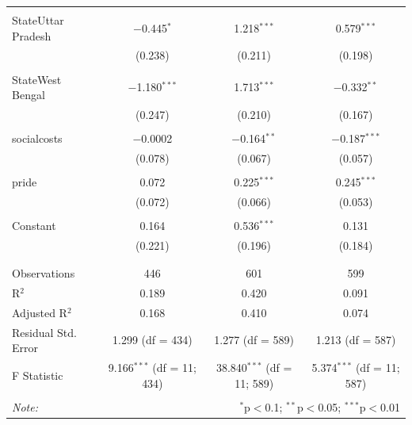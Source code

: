\documentclass[
]{article}
\begin{document}
\begin{table}[!htbp]
\begin{tabular}{@{\extracolsep{5pt}}lccc}
  & & & \\ 
 StateUttar Pradesh & $-$0.445$^{*}$ & 1.218$^{***}$ & 0.579$^{***}$ \\ 
  & (0.238) & (0.211) & (0.198) \\ 
  & & & \\ 
 StateWest Bengal & $-$1.180$^{***}$ & 1.713$^{***}$ & $-$0.332$^{**}$ \\ 
  & (0.247) & (0.210) & (0.167) \\ 
  & & & \\ 
 socialcosts & $-$0.0002 & $-$0.164$^{**}$ & $-$0.187$^{***}$ \\ 
  & (0.078) & (0.067) & (0.057) \\ 
  & & & \\ 
 pride & 0.072 & 0.225$^{***}$ & 0.245$^{***}$ \\ 
  & (0.072) & (0.066) & (0.053) \\ 
  & & & \\ 
 Constant & 0.164 & 0.536$^{***}$ & 0.131 \\ 
  & (0.221) & (0.196) & (0.184) \\ 
  & & & \\ 
\hline \\[-1.8ex] 
Observations & 446 & 601 & 599 \\ 
R$^{2}$ & 0.189 & 0.420 & 0.091 \\ 
Adjusted R$^{2}$ & 0.168 & 0.410 & 0.074 \\ 
Residual Std. Error & 1.299 (df = 434) & 1.277 (df = 589) & 1.213 (df = 587) \\ 
F Statistic & 9.166$^{***}$ (df = 11; 434) & 38.840$^{***}$ (df = 11; 589) & 5.374$^{***}$ (df = 11; 587) \\ 
\hline 
\hline \\[-1.8ex] 
\textit{Note:}  & \multicolumn{3}{r}{$^{*}$p$<$0.1; $^{**}$p$<$0.05; $^{***}$p$<$0.01} \\ 
\end{tabular} 
\end{table} 
\endgroup
\end{document}
